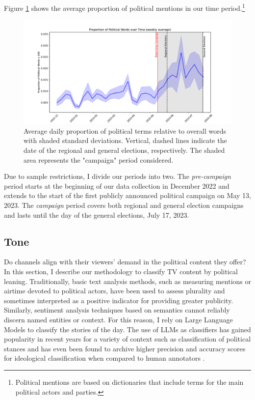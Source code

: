 \documentclass[12pt]{article}
\begin{document}
	Figure \ref{fig:coverage} shows the average proportion of political mentions in our time period.\footnote{Political mentions are based on dictionaries that include terms for the main political actors and parties.}
	
	\begin{figure}[h!]
		
		\centering
		\includegraphics[width=150mm]{figures/political_words2}
		\caption{Average daily proportion of political terms relative to overall words with shaded standard deviations. Vertical, dashed lines indicate the date of the regional and general elections, respectively. The shaded area represents the "campaign" period considered.}
		\label{fig:coverage}
	\end{figure}
	
	Due to sample restrictions, I divide our periods into two. The \textit{pre-campaign} period starts at the beginning of our data collection in December 2022 and extends to the start of the first publicly announced political campaign on May 13, 2023. The \textit{campaign} period covers both regional and general election campaigns and lasts until the day of the general elections, July 17, 2023.
	
	
	\subsection{ Tone}
	
	
	Do channels align with their viewers' demand in the political content they offer? In this section, I describe our methodology to classify TV content by political leaning. Traditionally, basic text analysis methods, such as measuring mentions or airtime devoted to political actors, have been used to assess plurality and sometimes interpreted as a positive indicator for providing greater publicity. Similarly, sentiment analysis techniques based on semantics cannot reliably discern named entities or context. For this reason, I rely on Large Language Models to classify the stories of the day. The use of LLMs as classifiers has gained popularity in recent years for a variety of context such as classification of political stances \citep{lemens} and has even been found to archive higher precision and accuracy scores for ideological classification when compared to human annotators \citep{tornberg2023}.
	
\end{document}
